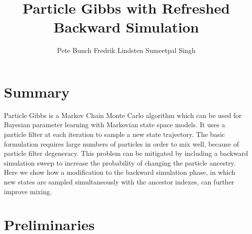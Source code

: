 \documentclass[landscape,a0,plainboxedsections]{sciposter}
\title{Particle Gibbs with Refreshed Backward Simulation}
\author{Pete Bunch \qquad Fredrik Lindsten \qquad Sumeetpal Singh}
\institute{Department of Engineering, University of Cambridge, Trumpington Street, Cambridge, CB2 1PZ, UK}
\begin{document}
\maketitle
\begin{multicols}{4}

\section{Summary}
Particle Gibbs is a Markov Chain Monte Carlo algorithm which can be used for Bayesian parameter learning with Markovian state space models. It uses a particle filter at each iteration to sample a new state trajectory. The basic formulation requires large numbers of particles in order to mix well, because of particle filter degeneracy. This problem can be mitigated by including a backward simulation sweep to increase the probability of changing the particle ancestry. Here we show how a modification to the backward simulation phase, in which new states are sampled simultaneously with the ancestor indexes, can further improve mixing.
%
%
%
\section{Preliminaries}

\end{multicols}
\end{document}
